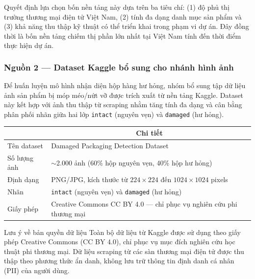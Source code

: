 Quyết định lựa chọn bốn nền tảng này dựa trên ba tiêu chí: (1) độ phủ thị trường thương mại điện tử Việt Nam, (2) tính đa dạng danh mục sản phẩm và (3) khả năng thu thập kỹ thuật có thể triển khai trong phạm vi dự án. Đây đồng thời là bốn nền tảng chiếm thị phần lớn nhất tại Việt Nam tính đến thời điểm thực hiện dự án.

\subsubsection{Nguồn 2 --- Dataset Kaggle bổ sung cho nhánh hình ảnh}

Để huấn luyện mô hình nhận diện hộp hàng hư hỏng, nhóm bổ sung tập dữ liệu ảnh sản phẩm bị móp méo/nứt vỡ được trích xuất từ nền tảng Kaggle. Dataset này kết hợp với ảnh thu thập từ scraping nhằm tăng tính đa dạng và cân bằng phân phối nhãn giữa hai lớp \texttt{intact} (nguyên vẹn) và \texttt{damaged} (hư hỏng).

\begin{center}
\renewcommand{\arraystretch}{1.4}
\begin{tabularx}{\textwidth}{|l|X|}
\hline
\rowcolor[HTML]{E8E8E8}
\multicolumn{1}{|c|}{\textbf{Thuộc tính}} & 
\multicolumn{1}{|c|}{\textbf{Chi tiết}} \\
\hline
Tên dataset & Damaged Packaging Detection Dataset \\
\hline
Số lượng ảnh & $\sim$2.000 ảnh (60\% hộp nguyên vẹn, 40\% hộp hư hỏng) \\
\hline
Định dạng & PNG/JPG, kích thước từ $224 \times 224$ đến $1024 \times 1024$ pixels \\
\hline
Nhãn & \texttt{intact} (nguyên vẹn) và \texttt{damaged} (hư hỏng) \\
\hline
Giấy phép & Creative Commons CC BY 4.0 --- chỉ phục vụ nghiên cứu phi thương mại \\
\hline
\end{tabularx}
\end{center}

\begin{warningbox}{Lưu ý về bản quyền dữ liệu}
Toàn bộ dữ liệu từ Kaggle được sử dụng theo giấy phép Creative Commons (CC BY 4.0), chỉ phục vụ mục đích nghiên cứu học thuật phi thương mại. Dữ liệu scraping từ các sàn thương mại điện tử được thu thập theo phương thức ẩn danh, không lưu trữ thông tin định danh cá nhân (PII) của người dùng.
\end{warningbox}

